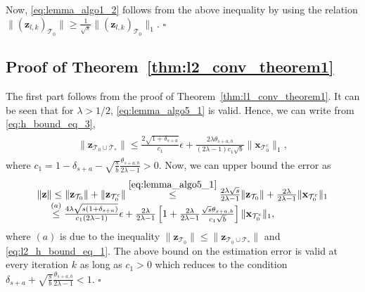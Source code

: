\documentclass[journal]{IEEEtran}
\newcommand{\mbx}{\mathbf{x}}
\newcommand{\mbz}{\mathbf{z}}
\newcommand{\T}{\mathcal{T}}
\newcommand*{\QEDB}{\hfill\ensuremath{\square}}%
\begin{document}
Now, \eqref{eq:lemma_algo1_2} follows from the above inequality by using the relation $\|\left(\mbz_{l,k}\right)_{\T_0} \| \geq \frac{1}{\sqrt{s}}\|\left(\mbz_{l,k}\right)_{\T_0} \|_1$.
\QEDB

\subsection{Proof of Theorem~\ref{thm:l2_conv_theorem1}}
The first part follows from the proof of Theorem~\ref{thm:l1_conv_theorem1}. It can be seen that for $\lambda > 1/2$, \eqref{eq:lemma_algo5_1} is valid. Hence, we can write from \eqref{eq:h_bound_eq_3},
\begin{eqnarray}
\label{eq:l2_h_bound_eq_1}
\begin{array}{l}
\|\mbz_{\T_0 \cup \T_*}\| \leq \frac{2\sqrt{1+\delta_{s+a}}}{c_1} \epsilon + \frac{2 \lambda \theta_{s+a,b}}{(2\lambda-1)c_1 \sqrt{b}} \|\mbx_{\T_0^c}\|_1,
\end{array}
\end{eqnarray}
where $c_1 = 1-\delta_{s+a}-\sqrt{\frac{s}{b}}\frac{\theta_{s+a,b}}{2\lambda -1} > 0$. Now, we can upper bound the error as
\begin{eqnarray*}
\begin{array}{l}
\|\mbz\| \leq \|\mbz_{\T_0}\| + \|\mbz_{\T_0^c}\|  \stackrel{\eqref{eq:lemma_algo5_1}}{\leq} \frac{2\lambda\sqrt{s}}{2\lambda -1} \|\mbz_{\T_0}\| + \frac{2\lambda}{2\lambda -1} \|\mbx_{\T_0^c}\|_1 \\
\hspace{5mm} \stackrel{(a)}{\leq} \frac{4 \lambda \sqrt{s(1+\delta_{s+a})}}{c_1(2\lambda -1)} \epsilon + \frac{2\lambda}{2\lambda -1}\left[1 + \frac{2\lambda}{2\lambda -1}  \frac{\sqrt{s}\theta_{s+a,b}}{c_1 \sqrt{b}}\right]\|\mbx_{\T_0^c}\|_1,
\end{array}
\end{eqnarray*}
where $(a)$ is due to the inequality $\|\mbz_{\T_0}\| \leq \|\mbz_{\T_0 \cup \T_*}\|$ and \eqref{eq:l2_h_bound_eq_1}. The above bound on the estimation error is valid at every iteration $k$ as long as $c_1 > 0$ which reduces to the condition $\delta_{s+a}+\sqrt{\frac{s}{b}}\frac{\theta_{s+a,b}}{2\lambda -1} < 1$. \QEDB
\end{document}
